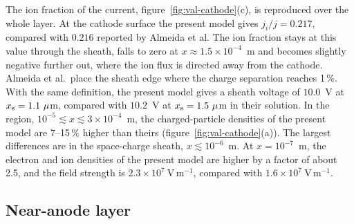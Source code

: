 The ion fraction of the current, figure~\ref{fig:val-cathode}(c), is reproduced over the whole layer. At the cathode surface the present model gives \(j_i/j=0.217\), compared with \(0.216\) reported by Almeida et al. The ion fraction stays at this value through the sheath, falls to zero at \(x\approx1.5\times10^{-4}\)~m and becomes slightly negative further out, where the ion flux is directed away from the cathode. Almeida et al.\ place the sheath edge where the charge separation reaches 1\,\%. With the same definition, the present model gives a sheath voltage of \(10.0\)~V at \(x_{\rm s}=1.1\ \mu\)m, compared with \(10.2\)~V at \(x_{\rm s}=1.5\ \mu\)m in their solution. In the region, \(10^{-5}\lesssim x\lesssim3\times10^{-4}\)~m, the charged-particle densities of the present model are 7--15\,\% higher than theirs (figure~\ref{fig:val-cathode}(a)). The largest differences are in the space-charge sheath, \(x\lesssim10^{-6}\)~m. At \(x=10^{-7}\)~m, the electron and ion densities of the present model are higher by a factor of about 2.5, and the field strength is \(2.3\times10^7\ \mathrm{V\,m^{-1}}\), compared with \(1.6\times10^7\ \mathrm{V\,m^{-1}}\).



\subsection{Near-anode layer}
\label{sec:val-anode}

